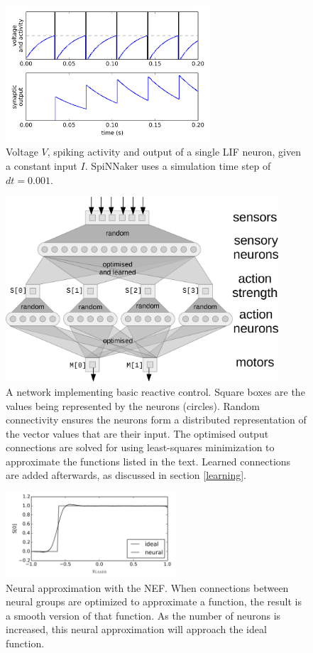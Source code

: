 \documentclass{frontiersSCNS}
\begin{document}
\begin{figure}[h!]
\centering
\includegraphics[width=3in]{../figures/neuron.png}
\caption{Voltage $V$, spiking activity and output of a single LIF neuron, given a constant input $I$.
SpiNNaker uses a simulation time step of $dt=0.001$.}
\label{Neuron}
\end{figure}

\begin{figure}[h!]
\centering
\includegraphics[width=4in]{../figures/network.png}
\caption{A network implementing basic reactive control. Square boxes are the
values being represented by the neurons (circles).  Random connectivity
ensures the neurons form a distributed representation of the vector values
that are their input.  The optimised output connections are solved for
using least-squares minimization to approximate the functions listed in
the text.  Learned connections are added afterwards, as discussed in 
section \ref{learning}.}
\label{Flow}
\end{figure}

\begin{figure}[h!]
\centering
\includegraphics[width=2.5in]{../figures/smoothing.png}
\caption{Neural approximation with the NEF. When connections between neural groups are optimized to approximate a function, the result is a smooth version of that function. As the number of neurons is increased, this neural approximation will approach the ideal function.}
\label{NEF}
\end{figure}
\end{document}
